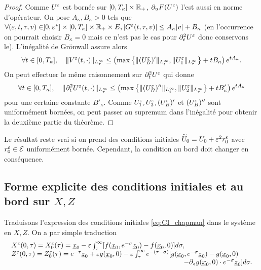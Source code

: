 \begin{proof}
Comme $U^{\varepsilon}$ est bornée sur $[0,T_{\kappa}]\times\mathbb{R}_+$, $\partial_{u} F(U^{\varepsilon})$ l'est aussi en norme d'opérateur. 
On pose $A_{\kappa},B_{\kappa} > 0$ tels que $\forall (\varepsilon,t,\tau,v)\in ]0,\varepsilon^*]\times [0,T_{\kappa}]\times\mathbb{R}_+\times E, |G^{\varepsilon}(t,\tau,v)| \leq A_{\kappa} |v| + B_{\kappa}$ 
(en l'occurrence on pourrait choisir $B_{\kappa} = 0$ mais ce n'est pas le cas pour $\partial_t^2 U^{\varepsilon}$ donc conservons le). L'inégalité de Grönwall assure alors 
$$\forall t\in[0,T_{\kappa}], \quad \|V^{\varepsilon}(t,\cdot)\|_{L^{\infty}_{\tau}} \leq \left(\max \left\{\|(U_B^{\varepsilon})'\|_{L^{\infty}_t},\|U_1^{\varepsilon}\|_{L^{\infty}_{\tau}}\right\} + tB_{\kappa} \right)e^{tA_{\kappa}}. $$
On peut effectuer le même raisonnement sur $\partial_t^2 U^{\varepsilon}$ qui donne $$\forall t\in[0,T_{\kappa}], \quad \|\partial_t^2 U^{\varepsilon}(t,\cdot)\|_{L^{\infty}_{\tau}} \leq \left(\max \left\{\|(U_B^{\varepsilon})''\|_{L^{\infty}_t},\|U_2^{\varepsilon}\|_{L^{\infty}_{\tau}}\right\} + tB'_{\kappa} \right)e^{tA_{\kappa}} $$ 
pour une certaine constante $B'_{\kappa}$. 
Comme $U_1^{\varepsilon},U_2^{\varepsilon},(U_B^{\varepsilon})'$ et $(U_B^{\varepsilon})''$ sont uniformément bornées, on peut passer au supremum dans l'inégalité pour obtenir la deuxième partie du théorème. 

\end{proof}

\begin{remark} \label{rq:eps_err}
Le résultat reste vrai si on prend des conditions initiales $\widetilde{U}_0 = U_0 + \varepsilon^2 r^{\varepsilon}_0$ avec $r^{\varepsilon}_0\in\mathcal{E}$ uniformément bornée. Cependant, la condition au bord doit changer en conséquence. 
\end{remark}


\subsection{Forme explicite des conditions initiales et au bord sur $X,Z$}

Traduisons l'expression des conditions initiales \eqref{eq:CI_chapman} dans le système en $X,Z$. On a par simple traduction 
\begin{equation}
\begin{array}{l}
\ \, X^{\varepsilon}(0,\tau) = X_0^{\varepsilon}(\tau) = \underline{x}_0 - \varepsilon \int_{\tau}^{\infty} [f(\underline{x}_0,e^{-\sigma}\underline{z}_0) - f(\underline{x}_0,0)] d\sigma , \\
\begin{array}{r}
Z^{\varepsilon}(0,\tau) = Z_0^{\varepsilon}(\tau) = e^{-\tau}\underline{z}_0 + \varepsilon g(\underline{x}_0,0) - \varepsilon \int_{\tau}^{\infty} e^{-(\tau-\sigma)}[
g(\underline{x}_0,e^{-\sigma}\underline{z}_0) - g(\underline{x}_0,0) \qquad\vphantom{1} \\ - \partial_{z} g(\underline{x}_0,0)\cdot e^{-\sigma}\underline{z}_0]d\sigma .
\end{array}
\end{array}
\end{equation}


